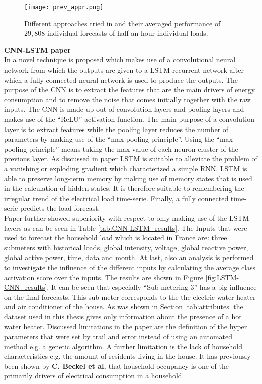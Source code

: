 \begin{figure}[h!]
	\centering
	\texttt{[image: prev\_appr.png]}
	\caption{Different approaches tried in \cite{Kong2019} and their averaged performance of $ 29,808 $ individual forecasts of half an hour individual loads. }
	\label{tab:LSTM_lit_result}
\end{figure}

\textbf{CNN-LSTM paper}\\
In \cite{Kim2019} a novel technique is proposed which makes use of a convolutional neural network from which the outputs are given to a LSTM recurrent network after which a fully connected neural network  is used to produce the outputs. The purpose of the CNN is to extract the features that are the main drivers of energy consumption and to remove the noise that comes initially together with the raw inputs. The CNN is made up out of convolution layers and pooling layers and makes use of the ``ReLU'' activation function. The main purpose of a convolution layer is to extract features while the pooling layer reduces the number of parameters by making use of the ``max pooling principle''. Using the ``max pooling principle'' means taking the max value of each neuron cluster of the previous layer. As discussed in paper \cite{Kong2019} LSTM is suitable to alleviate the problem of a vanishing or exploding gradient which characterized a simple RNN. LSTM is able to preserve long-term memory by making use of memory states that is used in the calculation of hidden states. It is therefore suitable to remembering the irregular trend of the electrical load time-serie. Finally, a fully connected time-serie predicts the load forecast.\\
Paper \cite{Kim2019} further showed superiority with respect to only making use of the LSTM layers as can be seen in Table \ref{tab:CNN-LSTM_results}. The  Inputs that were used to forecast the household load which is located in France are: three submeters with historical loads, global intensity, voltage, global reactive power, global active power, time, data and month. 
At last, also an analysis is performed to investigate the influence of the different inputs by calculating the average class activation score over the inputs. The results are shown in Figure \ref{fig:LSTM-CNN_results}. It can be seen that especially ``Sub metering $ 3 $'' has a big influence on the final forecasts. This sub meter corresponds to the the electric water heater and air conditioner of the house. As was shown in Section \ref{tab:attributes} the dataset used in this thesis gives only information about the presence of a hot water heater.  Discussed limitations in the paper are the definition of the hyper parameters that were set by trail and error instead of using an automated method e.g. a genetic algorithm. A further limitation is the lack of household characteristics e.g. the amount of residents living in the house. It has previously been shown by \textbf{C. Beckel et al.} that household occupancy is one of the primarily drivers of electrical consumption in a household.\\

